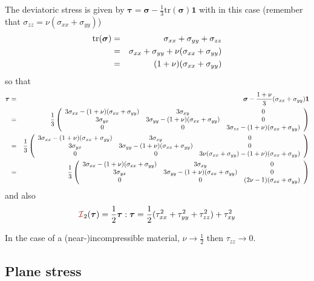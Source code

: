 The deviatoric stress is given by ${\bm \tau} 
= {\bm\sigma} -\frac13 \textrm{tr}(\bm\sigma){\bm 1}$ with
in this case (remember that $\sigma_{zz}=\nu(\sigma_{xx}+\sigma_{yy})$)
\begin{eqnarray}
\textrm{tr}(\bm\sigma) 
&=& \sigma_{xx}+\sigma_{yy}+\sigma_{zz} \nonumber\\
&=& \sigma_{xx}+\sigma_{yy}+\nu(\sigma_{xx}+\sigma_{yy})\nonumber\\
&=& (1+\nu) (\sigma_{xx}+\sigma_{yy})
\end{eqnarray}
so that
\begin{eqnarray}
{\bm \tau}
&=& {\bm\sigma} -\frac{1+\nu}{3} (\sigma_{xx}+\sigma_{yy})  {\bm 1} \nonumber\\
&=&
\frac13
\left(
\begin{array}{ccc}
3\sigma_{xx} - (1+\nu)(\sigma_{xx}+\sigma_{yy}) & 3\sigma_{xy} & 0 \\
3\sigma_{yx} & 3\sigma_{yy} - (1+\nu)(\sigma_{xx}+\sigma_{yy}) & 0 \\
0 & 0 & 3\sigma_{zz}- (1+\nu)(\sigma_{xx}+\sigma_{yy})
\end{array}
\right) \nonumber\\
&=&
\frac13
\left(
\begin{array}{ccc}
3\sigma_{xx} - (1+\nu)(\sigma_{xx}+\sigma_{yy}) & 3\sigma_{xy} & 0 \\
3\sigma_{yx} & 3\sigma_{yy} - (1+\nu)(\sigma_{xx}+\sigma_{yy}) & 0 \\
0 & 0 & 3\nu(\sigma_{xx}+\sigma_{yy})- (1+\nu)(\sigma_{xx}+\sigma_{yy})
\end{array}
\right) \nonumber\\
&=&
\frac13
\left(
\begin{array}{ccc}
3\sigma_{xx} - (1+\nu)(\sigma_{xx}+\sigma_{yy}) & 3\sigma_{xy} & 0 \\
3\sigma_{yx} & 3\sigma_{yy} - (1+\nu)(\sigma_{xx}+\sigma_{yy}) & 0 \\
0 & 0 & (2\nu-1)(\sigma_{xx}+\sigma_{yy})
\end{array}
\right) 
\end{eqnarray}
and also
\[
{\III}_2(\bm\tau)
={\frac12 {\bm\tau}:{\bm\tau}}
={\frac12(\tau_{xx}^2+\tau_{yy}^2+\tau_{zz}^2) +\tau_{xy}^2
}
\]
\begin{remark}
In the case of a (near-)incompressible material, $\nu\rightarrow \frac12$ then $\tau_{zz} \rightarrow 0$.
\end{remark}


\subsection{Plane stress}

